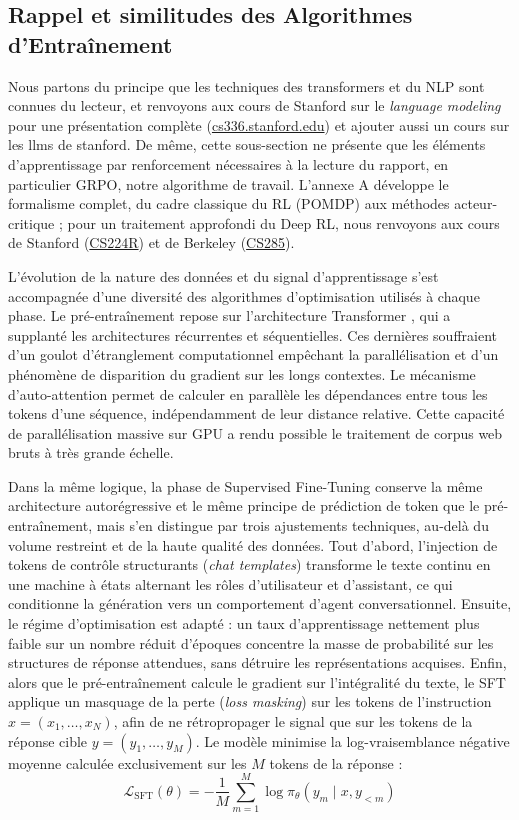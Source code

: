 \documentclass[11pt,a4paper]{article}
\begin{document}
\subsection{Rappel et similitudes des Algorithmes d'Entraînement}

Nous partons du principe que les techniques des transformers et du NLP sont connues du lecteur, et renvoyons aux cours de Stanford sur le \emph{language modeling} pour une présentation complète (\href{https://cs336.stanford.edu/}{cs336.stanford.edu}) et ajouter aussi un cours sur les llms de stanford. De même, cette sous-section ne présente que les éléments d'apprentissage par renforcement nécessaires à la lecture du rapport, en particulier GRPO, notre algorithme de travail. L'annexe A développe le formalisme complet, du cadre classique du RL (POMDP) aux méthodes acteur-critique ; pour un traitement approfondi du Deep RL, nous renvoyons aux cours de Stanford (\href{https://cs224r.stanford.edu/}{CS224R}) et de Berkeley (\href{https://rail.eecs.berkeley.edu/deeprlcourse/}{CS285}).

L'évolution de la nature des données et du signal d'apprentissage s'est accompagnée d'une diversité des algorithmes d'optimisation utilisés à chaque phase. Le pré-entraînement repose sur l'architecture Transformer \cite{vaswani2017attention}, qui a supplanté les architectures récurrentes et séquentielles. Ces dernières souffraient d'un goulot d'étranglement computationnel empêchant la parallélisation et d'un phénomène de disparition du gradient sur les longs contextes. Le mécanisme d'auto-attention permet de calculer en parallèle les dépendances entre tous les tokens d'une séquence, indépendamment de leur distance relative. Cette capacité de parallélisation massive sur GPU a rendu possible le traitement de corpus web bruts à très grande échelle.

Dans la même logique, la phase de Supervised Fine-Tuning conserve la même architecture autorégressive et le même principe de prédiction de token que le pré-entraînement, mais s'en distingue par trois ajustements techniques, au-delà du volume restreint et de la haute qualité des données. Tout d'abord, l'injection de tokens de contrôle structurants (\emph{chat templates}) transforme le texte continu en une machine à états alternant les rôles d'utilisateur et d'assistant, ce qui conditionne la génération vers un comportement d'agent conversationnel. Ensuite, le régime d'optimisation est adapté : un taux d'apprentissage nettement plus faible sur un nombre réduit d'époques concentre la masse de probabilité sur les structures de réponse attendues, sans détruire les représentations acquises. Enfin, alors que le pré-entraînement calcule le gradient sur l'intégralité du texte, le SFT applique un masquage de la perte (\emph{loss masking}) sur les tokens de l'instruction $x = (x_1, \dots, x_N)$, afin de ne rétropropager le signal que sur les tokens de la réponse cible $y = (y_1, \dots, y_M)$. Le modèle minimise la log-vraisemblance négative moyenne calculée exclusivement sur les $M$ tokens de la réponse :
\begin{equation}
\mathcal{L}_{\text{SFT}}(\theta) = -\frac{1}{M} \sum_{m=1}^{M} \log \pi_\theta(y_m \mid x, y_{<m})
\end{equation}
\end{document}
